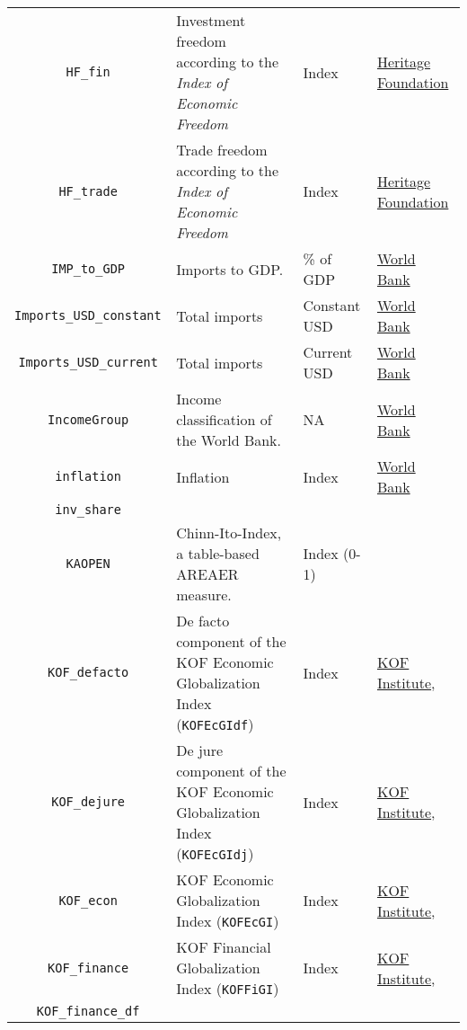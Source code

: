 \documentclass[
	a4paper,
	11pt,
	bibtotoc,
	headings=standardclasses,
  	headings=big]{scrartcl}
\newcommand{\code}[1]{\colorbox{gray!20}{\texttt{#1}}}
\begin{document}
\begin{longtable}{cL{5cm}L{2cm}L{2.75cm}}
\code{HF\_fin} & Investment freedom according to the \textit{Index of Economic Freedom}  & Index & \href{https://www.heritage.org/index/explore}{Heritage Foundation} \\
\code{HF\_trade} & Trade freedom according to the \textit{Index of Economic Freedom} & Index & \href{https://www.heritage.org/index/explore}{Heritage Foundation} \\
%
\code{IMP\_to\_GDP} & Imports to GDP. & \% of GDP & \href{https://data.worldbank.org/indicator/NE.IMP.GNFS.ZS}{World Bank}\\
\code{Imports\_USD\_constant } & Total imports & Constant USD & \href{https://data.worldbank.org/indicator/NE.IMP.GNFS.KD}{World Bank}\\
\code{Imports\_USD\_current} & Total imports & Current USD & \href{https://data.worldbank.org/indicator/NE.IMP.GNFS.CD}{World Bank}\\
\code{IncomeGroup} & Income classification of the World Bank. & NA & \href{https://datahelpdesk.worldbank.org/knowledgebase/articles/906519-world-bank-country-and-lending-groups}{World Bank}\\
\code{inflation} & Inflation & Index & \href{https://data.worldbank.org/indicator/FP.CPI.TOTL.ZG}{World Bank}\\
\code{inv\_share} & & & \\
%
\code{KAOPEN}  & Chinn-Ito-Index, a table-based AREAER measure. & Index (0-1)& \citet{Chinn.2008}\\
%
\code{KOF\_defacto} & De facto component of the KOF Economic Globalization Index (\code{KOFEcGIdf}) & Index & \href{https://kof.ethz.ch/en/forecasts-and-indicators/indicators/kof-globalisation-index.html}{KOF Institute}, \citet{Gygli.2019}\\
\code{KOF\_dejure} & De jure component of the KOF Economic Globalization Index (\code{KOFEcGIdj}) & Index & \href{https://kof.ethz.ch/en/forecasts-and-indicators/indicators/kof-globalisation-index.html}{KOF Institute}, \citet{Gygli.2019}\\
\code{KOF\_econ} & KOF Economic Globalization Index (\code{KOFEcGI}) & Index & \href{https://kof.ethz.ch/en/forecasts-and-indicators/indicators/kof-globalisation-index.html}{KOF Institute}, \citet{Gygli.2019}\\
\code{KOF\_finance} & KOF Financial Globalization Index (\code{KOFFiGI}) & Index & \href{https://kof.ethz.ch/en/forecasts-and-indicators/indicators/kof-globalisation-index.html}{KOF Institute}, \citet{Gygli.2019}\\\code{KOF\_finance\_df} & & & \\

\end{longtable}
\end{document}
